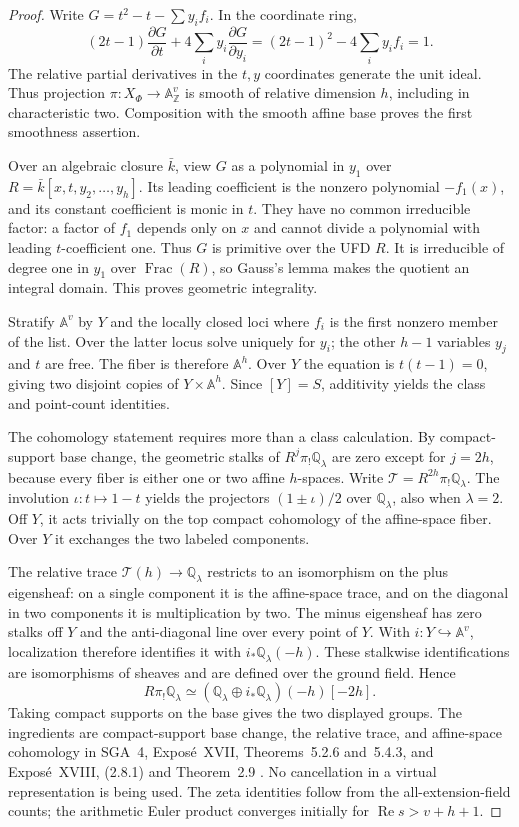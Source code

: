 \begin{proof}
Write $G=t^2-t-\sum y_if_i$. In the coordinate ring,
\[
 (2t-1)\frac{\partial G}{\partial t}
        +4\sum_i y_i\frac{\partial G}{\partial y_i}
 =(2t-1)^2-4\sum_i y_if_i=1.
\]
The relative partial derivatives in the $t,y$ coordinates generate the unit ideal. Thus projection $\pi:X_\Phi\to\mathbb A^v_{\mathbb Z}$ is smooth of relative dimension $h$, including in characteristic two. Composition with the smooth affine base proves the first smoothness assertion.

Over an algebraic closure $\bar k$, view $G$ as a polynomial in $y_1$ over $R=\bar k[x,t,y_2,\ldots,y_h]$. Its leading coefficient is the nonzero polynomial $-f_1(x)$, and its constant coefficient is monic in $t$. They have no common irreducible factor: a factor of $f_1$ depends only on $x$ and cannot divide a polynomial with leading $t$-coefficient one. Thus $G$ is primitive over the UFD $R$. It is irreducible of degree one in $y_1$ over $\operatorname{Frac}(R)$, so Gauss's lemma makes the quotient an integral domain. This proves geometric integrality.

Stratify $\mathbb A^v$ by $Y$ and the locally closed loci where $f_i$ is the first nonzero member of the list. Over the latter locus solve uniquely for $y_i$; the other $h-1$ variables $y_j$ and $t$ are free. The fiber is therefore $\mathbb A^h$. Over $Y$ the equation is $t(t-1)=0$, giving two disjoint copies of $Y\times\mathbb A^h$. Since $[Y]=S$, additivity yields the class and point-count identities.

The cohomology statement requires more than a class calculation. By compact-support base change, the geometric stalks of $R^j\pi_!\mathbb Q_\lambda$ are zero except for $j=2h$, because every fiber is either one or two affine $h$-spaces. Write $\mathcal T=R^{2h}\pi_!\mathbb Q_\lambda$. The involution $\iota:t\mapsto1-t$ yields the projectors $(1\pm\iota)/2$ over $\mathbb Q_\lambda$, also when $\lambda=2$. Off $Y$, it acts trivially on the top compact cohomology of the affine-space fiber. Over $Y$ it exchanges the two labeled components.

The relative trace $\mathcal T(h)\to\mathbb Q_\lambda$ restricts to an isomorphism on the plus eigensheaf: on a single component it is the affine-space trace, and on the diagonal in two components it is multiplication by two. The minus eigensheaf has zero stalks off $Y$ and the anti-diagonal line over every point of $Y$. With $i:Y\hookrightarrow\mathbb A^v$, localization therefore identifies it with $i_*\mathbb Q_\lambda(-h)$. These stalkwise identifications are isomorphisms of sheaves and are defined over the ground field. Hence
\[
 R\pi_!\mathbb Q_\lambda
   \simeq(\mathbb Q_\lambda\oplus i_*\mathbb Q_\lambda)(-h)[-2h].
\]
Taking compact supports on the base gives the two displayed groups. The ingredients are compact-support base change, the relative trace, and affine-space cohomology in SGA~4, Expos\'e~XVII, Theorems~5.2.6 and~5.4.3, and Expos\'e~XVIII, (2.8.1) and Theorem~2.9 \cite{ff-sga4}. No cancellation in a virtual representation is being used. The zeta identities follow from the all-extension-field counts; the arithmetic Euler product converges initially for $\operatorname{Re}s>v+h+1$.
\end{proof}

